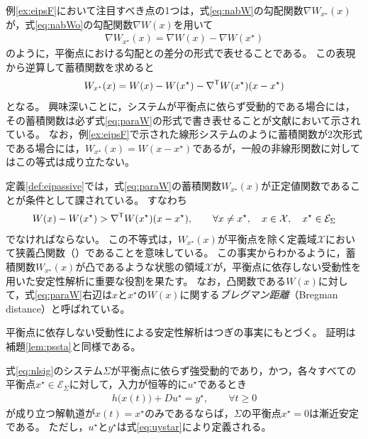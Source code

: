 \documentclass[tombow,dvipdfmx]{corona-a5}
\begin{document}
例\ref{ex:eipsF}において注目すべき点の1つは，式\ref{eq:nabW}の勾配関数$\nabla W_{x^{\star}}(x)$が，式\ref{eq:nabWo}の勾配関数$\nabla W(x)$を用いて
\begin{align*}
\nabla W_{x^{\star}}(x) = \nabla W(x) - \nabla W(x^{\star})
\end{align*}
のように，平衡点における勾配との差分の形式で表せることである。
この表現から逆算して蓄積関数を求めると
\begin{align}\label{eq:paraW}
W_{x^{\star}}(x) = W(x) - W(x^{\star}) - \nabla^{\sf T} W(x^{\star}) (x-x^{\star})
\end{align}
となる。
興味深いことに，システムが平衡点に依らず受動的である場合には，その蓄積関数は必ず式\ref{eq:paraW}の形式で書き表せることが文献\cite{simpson2019equilibrium}において示されている。
なお，例\ref{ex:eipsF}で示された線形システムのように蓄積関数が2次形式である場合には，$W_{x^{\star}}(x)=W(x-x^{\star})$であるが，一般の非線形関数に対してはこの等式は成り立たない。

定義\ref{def:eipassive}では，式\ref{eq:paraW}の蓄積関数$W_{x^{\star}}(x)$が正定値関数であることが条件として課されている。
すなわち
\begin{align*}
W(x) - W(x^{\star})  > \nabla^{\sf T} W(x^{\star}) (x-x^{\star})
,\qquad
\forall x\neq x^{\star},
 \quad
x \in \mathcal{X}
,\quad
x^{\star} \in \mathcal{E}_{\Sigma}
\end{align*}
でなければならない。
この不等式は，$W_{x^{\star}}(x)$が平衡点を除く定義域$\mathcal{X}$において狭義凸関数（）であることを意味している。
この事実からわかるように，蓄積関数$W_{x^{\star}}(x)$が凸であるような状態の領域$\mathcal{X}$が，平衡点に依存しない受動性を用いた安定性解析に重要な役割を果たす。
なお，凸関数である$W(x)$に対して，式\ref{eq:paraW}右辺は$x$と$x^{\star}$の$W(x)$に関する\emph{ブレグマン距離}（Bregman distance）と呼ばれている。


平衡点に依存しない受動性による安定性解析はつぎの事実にもとづく。
証明は補題\ref{lem:pssta}と同様である。

\begin{補題}[平衡点に依らず強受動的なシステムの漸近安定性]\label{lem:eipssta}
式\ref{eq:nlsig}のシステム$\Sigma$が平衡点に依らず強受動的であり，かつ，各々すべての平衡点$x^{\star} \in \mathcal{E}_{\Sigma}$に対して，入力が恒等的に$u^{\star}$であるとき
\begin{align}\label{eq:eizeroso}
h\bigl(
x(t)
\bigr) + D u^{\star}= y^{\star},\qquad
\forall t\geq 0
\end{align}
が成り立つ解軌道が$x(t)=x^{\star}$のみであるならば，$\Sigma$の平衡点$x^{\star}=0$は漸近安定である。
ただし，$u^{\star}$と$y^{\star}$は式\ref{eq:uystar}により定義される。
\end{補題}
\end{document}
